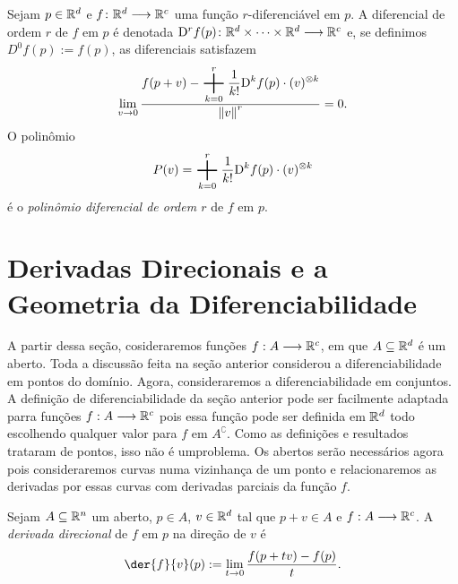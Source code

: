 \begin{nota}
Sejam $p \in \mathbb{R}^d$ e $f\colon \mathbb{R}^d \longrightarrow \mathbb{R}^c$ uma função $r$-diferenciável em $p$. A diferencial de ordem $r$ de $f$ em $p$ é denotada $\mathrm{D}^r f(p)\colon \mathbb{R}^d \times \cdots \times \mathbb{R}^d \longrightarrow \mathbb{R}^c$ e, se definimos $D^0f(p):=f(p)$, as diferenciais satisfazem
	\begin{equation*}
	\lim_{v \conv 0} \frac{\displaystyle f(p+v) - \sum_{k=0}^r \frac{1}{k!}\D^k f(p) \cdot (v)^{\otimes k}}{\nor{v}^r} = 0.
	\end{equation*}
O polinômio
	\begin{equation*}
	P(v) = \sum_{k=0}^r \frac{1}{k!}\D^k f(p) \cdot (v)^{\otimes k}
	\end{equation*}
é o \emph{polinômio diferencial de ordem $r$} de $f$ em $p$.
\end{nota}

\section{Derivadas Direcionais e a Geometria da Diferenciabilidade}

A partir dessa seção, cosideraremos funções $f: A \longrightarrow \mathbb{R}^c$, em que $A \subseteq \mathbb{R}^d$ é um aberto. Toda a discussão feita na seção anterior considerou a diferenciabilidade em pontos do domínio. Agora, consideraremos a diferenciabilidade em conjuntos. A definição de diferenciabilidade da seção anterior pode ser facilmente adaptada parra funções $f: A \longrightarrow \mathbb{R}^c$ pois essa função pode ser definida em $\mathbb{R}^d$ todo escolhendo qualquer valor para $f$ em $A^\complement$. Como as definições e resultados trataram de pontos, isso não é umproblema. Os abertos serão necessários agora pois consideraremos curvas numa vizinhança de um ponto e relacionaremos as derivadas por essas curvas com derivadas parciais da função $f$.

\begin{defi}
Sejam $A \subseteq \mathbb{R}^n$ um aberto, $p \in A$, $v \in \mathbb{R}^d$ tal que $p+v \in A$ e $f: A \longrightarrow \mathbb{R}^c$. A \emph{derivada direcional} de $f$ em $p$ na direção de $v$ é
	\begin{equation*}
	\der{f}{v}(p) := \lim_{t \conv 0} \frac{f(p+tv)-f(p)}{t}.
	\end{equation*}
\end{defi}

